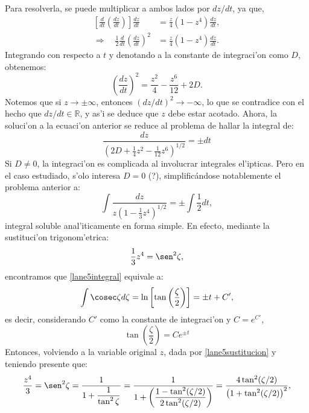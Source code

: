 Para resolverla, se puede multiplicar a ambos lados por $dz/dt$, ya que,
\begin{align}
\left[\frac{d}{dt}\left(\frac{dz}{dt}\right)\right]\frac{dz}{dt}&=\frac{z}{4}(1-z^4)\frac{dz}{dt},\\
\Rightarrow\quad \frac{1}{2}\frac{d}{dt}\left(\frac{dz}{dt}\right)^2&=\frac{z}{4}(1-z^4)\frac{dz}{dt}.
\end{align}
Integrando con respecto a $t$ y denotando a la constante de integraci'on como $D$, obtenemos:
\begin{equation}
\left(\frac{dz}{dt}\right)^2=\frac{z^2}{4}-\frac{z^6}{12}+2D.
\end{equation}
Notemos que si $z\to\pm\infty$, entonces $(dz/dt)^2\to-\infty$, lo que se contradice con el hecho que $dz/dt\in \mathbb{R}$, y as'i se deduce que $z$ debe estar acotado. Ahora, la soluci'on a la ecuaci'on anterior se reduce al problema de hallar la integral de:
\begin{equation}
 \frac{dz}{\left(2D+\frac{1}{4}z^2-\frac{1}{12}z^6\right)^{1/2}}=\pm dt
\end{equation}
Si $D\neq0$, la integraci'on es complicada al involucrar integrales el'ipticas. Pero en el caso estudiado, s'olo interesa $D=0$ (?), simplific\'andose notablemente el problema anterior a:
\begin{equation}\label{lane5integral}
 \int\frac{dz}{z\left(1-\frac{1}{3}z^4\right)^{1/2}}=\pm\int\frac{1}{2}dt,
\end{equation}
integral soluble anal'iticamente en forma simple. En efecto, mediante la sustituci'on trigonom'etrica:
\begin{equation}\label{lane5sustitucion}
\frac{1}{3}z^4=\sen^2 \zeta,
\end{equation}
encontramos que \eqref{lane5integral} equivale a:
\begin{equation}
\int\cosec\zeta d\zeta =\ln\left[\tan\left(\frac{\zeta}{2}\right)\right]=\pm t+C',
\end{equation}
es decir, considerando $C'$ como la constante de integraci'on y $C=e^{C'}$,
\begin{equation}
 \tan\left(\frac{\zeta}{2}\right)=C e^{\pm t}
\end{equation}
Entonces, volviendo a la variable original $z$, dada por \eqref{lane5sustitucion} y teniendo presente que:
\begin{equation}
\frac{z^4}{3}= \sen^2 \zeta=\frac{1}{1+\dfrac{1}
{\tan^2\zeta}}=\frac{1}{1+\left(\dfrac{1-\tan^2(\zeta/2)}
{2\tan^2(\zeta/2)}\right)}=\frac{4\tan^2(\zeta/2)}{\left(1+\tan^2(\zeta/2)\right)^2},
\end{equation}
